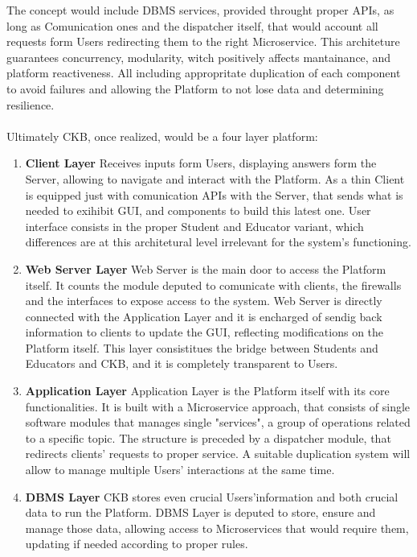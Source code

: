 The concept would include DBMS services, provided throught proper APIs, as long as Comunication ones and the dispatcher itself, that would account all requests form Users redirecting them to the right Microservice. This architeture guarantees concurrency, modularity, witch positively affects mantainance, and platform reactiveness.
All including appropritate duplication of each component to avoid failures and allowing the Platform to not lose data and determining resilience.\\\\
Ultimately CKB, once realized, would be a four layer platform:
\begin{enumerate}
    \item \textbf{Client Layer} Receives inputs form Users, displaying answers form the Server, allowing to navigate and interact with the Platform. As a thin Client is equipped just with comunication APIs with the Server, that sends what is needed to exihibit GUI, and components to build this latest one. User interface consists in the proper Student and Educator variant, which differences are at this architetural level irrelevant for the system's functioning.
    \item \textbf{Web Server Layer} Web Server is the main door to access the Platform itself. It counts the module deputed to comunicate with clients, the firewalls and the interfaces to expose access to the system. Web Server is directly connected with the Application Layer and it is encharged of sendig back information to clients to update the GUI, reflecting modifications on the Platform itself. This layer consistitues the bridge between Students and Educators and CKB, and it is completely transparent to Users.
    \item \textbf{Application Layer} Application Layer is the Platform itself with its core functionalities. It is built with a Microservice approach, that consists of single software modules that manages single "services", a group of operations related to a specific topic. The structure is preceded by a dispatcher module, that redirects clients' requests to proper service. A suitable duplication system will allow to manage multiple Users' interactions at the same time.
    \item \textbf{DBMS Layer} CKB stores even crucial Users'information and both crucial data to run the Platform. DBMS Layer is deputed to store, ensure and manage those data, allowing access to Microservices that would require them, updating if needed according to proper rules. 
\end{enumerate}
